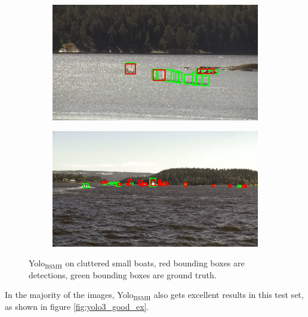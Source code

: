 \begin{figure}[h!]
\begin{subfigure}{.5\textwidth}
  \centering
  \includegraphics[width=0.8\linewidth]{discussion/clutter_yolo3/selected_08_10_frame0130.jpg}
\end{subfigure}%
\begin{subfigure}{.5\textwidth}
  \centering
  \includegraphics[width=.8\linewidth]{discussion/clutter_yolo3/selected_08_11_frame6630.jpg}
\end{subfigure}
\caption{Yolo$_{\text{BSMH}}$ on cluttered small boats, red bounding boxes are detections, green bounding boxes are ground truth.}
\label{fig:yolo3_clutter}
\end{figure}

\newpage

\noindent
In the majority of the images, Yolo$_{\text{BSMH}}$ also gets excellent results in this test set, as shown in figure \ref{fig:yolo3_good_ex}.


